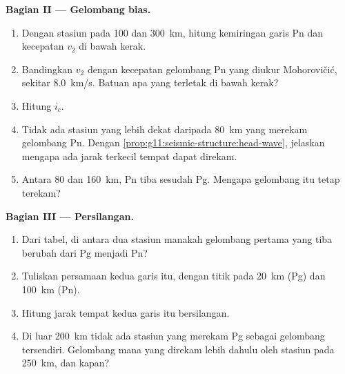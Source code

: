 \begin{problem}
\medskip
\noindent\textbf{Bagian II --- Gelombang bias.}
\begin{enumerate}[resume]
  \item Dengan stasiun pada 100 dan \qty{300}{km}, hitung kemiringan
        garis Pn dan kecepatan $v_2$  di bawah kerak.
  \item Bandingkan $v_2$ dengan kecepatan gelombang Pn yang diukur Mohorovičić,
        sekitar \qty{8.0}{km/s}. Batuan apa yang terletak di bawah kerak?
  \item Hitung  $i_c$.
  \item Tidak ada stasiun yang lebih dekat daripada \qty{80}{km} yang merekam
        gelombang Pn. Dengan \cref{prop:g11:seismic-structure:head-wave},
        jelaskan mengapa ada jarak terkecil tempat  dapat
        direkam.
  \item Antara 80 dan \qty{160}{km}, Pn tiba sesudah Pg. Mengapa gelombang itu
        tetap terekam?
\end{enumerate}

\medskip
\noindent\textbf{Bagian III --- Persilangan.}
\begin{enumerate}[resume]
  \item Dari tabel, di antara dua stasiun manakah gelombang pertama yang
        tiba berubah dari Pg menjadi Pn?
  \item Tuliskan persamaan kedua garis itu, dengan titik pada
        \qty{20}{km} (Pg) dan \qty{100}{km} (Pn).
  \item Hitung jarak tempat kedua garis itu bersilangan.
  \item Di luar \qty{200}{km} tidak ada stasiun yang merekam Pg sebagai gelombang
        tersendiri. Gelombang mana yang direkam lebih dahulu oleh stasiun pada
        \qty{250}{km}, dan kapan?
\end{enumerate}


\end{problem}
